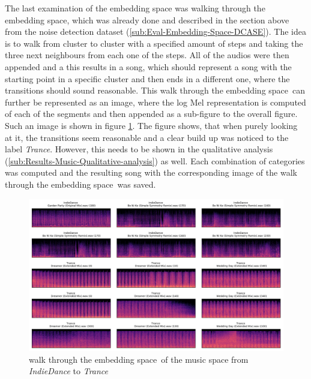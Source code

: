 The last examination of the embedding space was walking through the embedding space, which was already done and described in the section above from the noise detection dataset (\ref{sub:Eval-Embedding-Space-DCASE}). The idea is to walk from cluster to cluster with a specified amount of steps and taking the three next neighbours from each one of the steps. All of the audios were then appended and a this results in a song, which should represent a song with the starting point in a specific cluster and then ends in a different one, where the transitions should sound reasonable. This \flqq walk through the embedding space\frqq \ can further be represented as an image, where the log Mel representation is computed of each of the segments and then appended as a sub-figure to the overall figure. Such an image is shown in figure \ref{fig:Walk-through-Music}. The figure shows, that when purely looking at it, the transitions seem reasonable and a clear build up was noticed to the label \textit{Trance}. However, this needs to be shown in the qualitative analysis (\ref{sub:Results-Music-Qualitative-analysis}) as well. Each combination of categories was computed and the resulting song with the corresponding image of the \flqq walk through the embedding space\frqq \ was saved.
\begin{figure}[ht]
\centering
    \includegraphics[width=0.9\linewidth]{img/Walk_through_music_space.png}
    \caption{\flqq walk through the embedding space\frqq \ of the music space from \textit{IndieDance} to \textit{Trance}}
    \label{fig:Walk-through-Music}
\end{figure}

